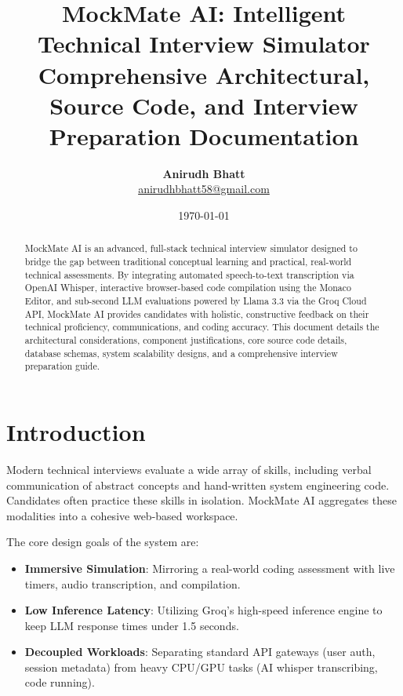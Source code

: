 \documentclass[11pt,a4paper]{article}
\title{\textbf{MockMate AI: Intelligent Technical Interview Simulator} \\ \large Comprehensive Architectural, Source Code, and Interview Preparation Documentation}
\author{\textbf{Anirudh Bhatt} \\ \small \href{mailto:anirudhbhatt58@gmail.com}{anirudhbhatt58@gmail.com}}
\date{\today}
\begin{document}
\maketitle

\begin{abstract}
MockMate AI is an advanced, full-stack technical interview simulator designed to bridge the gap between traditional conceptual learning and practical, real-world technical assessments. By integrating automated speech-to-text transcription via OpenAI Whisper, interactive browser-based code compilation using the Monaco Editor, and sub-second LLM evaluations powered by Llama 3.3 via the Groq Cloud API, MockMate AI provides candidates with holistic, constructive feedback on their technical proficiency, communications, and coding accuracy. This document details the architectural considerations, component justifications, core source code details, database schemas, system scalability designs, and a comprehensive interview preparation guide.
\end{abstract}

\newpage
\tableofcontents
\newpage

\section{Introduction}
Modern technical interviews evaluate a wide array of skills, including verbal communication of abstract concepts and hand-written system engineering code. Candidates often practice these skills in isolation. MockMate AI aggregates these modalities into a cohesive web-based workspace.

The core design goals of the system are:
\begin{itemize}
    \item \textbf{Immersive Simulation}: Mirroring a real-world coding assessment with live timers, audio transcription, and compilation.
    \item \textbf{Low Inference Latency}: Utilizing Groq's high-speed inference engine to keep LLM response times under 1.5 seconds.
    \item \textbf{Decoupled Workloads}: Separating standard API gateways (user auth, session metadata) from heavy CPU/GPU tasks (AI whisper transcribing, code running).
\end{itemize}
\end{document}

